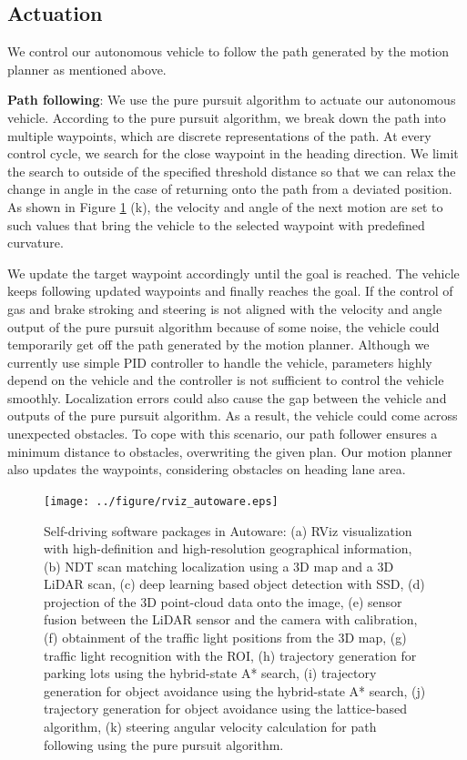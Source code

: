 \subsection{Actuation}
\label{sec:actuation}
We control our autonomous vehicle to follow the path generated by the motion planner as mentioned above.

\textbf{Path following}:
We use the pure pursuit algorithm \cite{coulter1992implementation} to actuate our autonomous vehicle.
According to the pure pursuit algorithm, we break down the path into multiple waypoints, which are discrete representations of the path.
At every control cycle, we search for the close waypoint in the heading direction.
We limit the search to outside of the specified threshold distance so that we can relax the change in angle in the case of returning onto the path from a deviated position.
As shown in Figure \ref{fig:rviz_autoware} (k), the velocity and angle of the next motion are set to such values that bring the vehicle to the selected waypoint with predefined curvature.

We update the target waypoint accordingly until the goal is reached.
The vehicle keeps following updated waypoints and finally reaches the goal.
If the control of gas and brake stroking and steering is not aligned with the velocity and angle output of the pure pursuit algorithm because of some noise, the vehicle could temporarily get off the path generated by the motion planner.
Although we currently use simple PID controller to handle the vehicle, parameters highly depend on the vehicle and the controller is not sufficient to control the vehicle smoothly.
Localization errors could also cause the gap between the vehicle and outputs of the pure pursuit algorithm.
As a result, the vehicle could come across unexpected obstacles.
To cope with this scenario, our path follower ensures a minimum distance to obstacles, overwriting the given plan.
Our motion planner also updates the waypoints, considering obstacles on heading lane area.

\clearpage

\begin{figure}[!htbp]
  \centering
  \texttt{[image: ../figure/rviz\_autoware.eps]}
  \caption{\label{fig:rviz_autoware}
  Self-driving software packages in Autoware:
  (a) RViz visualization with high-definition and high-resolution geographical information,
  (b) NDT scan matching localization using a 3D map and a 3D LiDAR scan,
  (c) deep learning based object detection with SSD, 
  (d) projection of the 3D point-cloud data onto the image, 
  (e) sensor fusion between the LiDAR sensor and the camera with calibration,
  (f) obtainment of the traffic light positions from the 3D map,
  (g) traffic light recognition with the ROI,
  (h) trajectory generation for parking lots using the hybrid-state A* search,
  (i) trajectory generation for object avoidance using the hybrid-state A* search,
  (j) trajectory generation for object avoidance using the lattice-based algorithm,
  (k) steering angular velocity calculation for path following using the pure pursuit algorithm.}
\end{figure}
